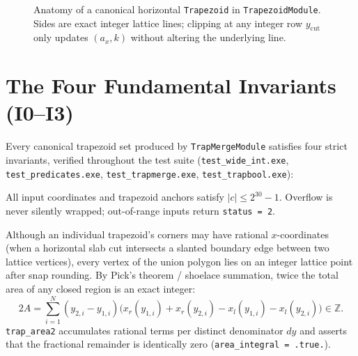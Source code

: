 \begin{figure}[htbp]
\caption{Anatomy of a canonical horizontal \texttt{Trapezoid} in \texttt{TrapezoidModule}. Sides are exact integer lattice lines; clipping at any integer row $y_{\text{cut}}$ only updates $(a_x, k)$ without altering the underlying line.}
\label{fig:trapezoid_anatomy}
\end{figure}

\section{The Four Fundamental Invariants (I0--I3)}

Every canonical trapezoid set produced by \texttt{TrapMergeModule} satisfies four strict invariants, verified throughout the test suite (\texttt{test\_wide\_int.exe}, \texttt{test\_predicates.exe}, \texttt{test\_trapmerge.exe}, \texttt{test\_trapbool.exe}):

\begin{invariant}
All input coordinates and trapezoid anchors satisfy $|c| \le 2^{30} - 1$. Overflow is never silently wrapped; out-of-range inputs return \texttt{status = 2}.
\end{invariant}

\begin{invariant}
Although an individual trapezoid's corners may have rational $x$-coordinates (when a horizontal slab cut intersects a slanted boundary edge between two lattice vertices), every vertex of the union polygon lies on an integer lattice point after snap rounding. By Pick's theorem / shoelace summation, twice the total area of any closed region is an exact integer:
\begin{equation}
  2A = \sum_{i=1}^{N} (y_{2,i} - y_{1,i})\bigl(x_r(y_{1,i}) + x_r(y_{2,i}) - x_l(y_{1,i}) - x_l(y_{2,i})\bigr) \in \mathbb{Z}.
\end{equation}
\texttt{trap\_area2} accumulates rational terms per distinct denominator $dy$ and asserts that the fractional remainder is identically zero (\texttt{area\_integral = .true.}).
\end{invariant}

